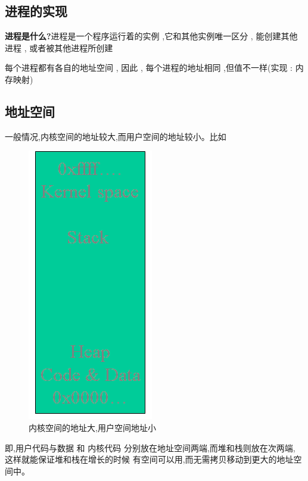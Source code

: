 \documentclass[UTF8,a4paper]{ctexart}
\begin{document}
\subsection{进程的实现}
\textbf{进程是什么?}进程是一个程序运行着的实例 ,它和其他实例唯一区分 , 能创建其他进程 , 或者被其他进程所创建

每个进程都有各自的地址空间 , 因此 , 每个进程的地址相同 ,但值不一样(实现 : 内存映射)

\subsection{地址空间}
一般情况,内核空间的地址较大,而用户空间的地址较小。比如
\begin{figure}[H]
	\centering
	\includegraphics[scale = 0.3]{assets/ModernOperatingSystems_8866a.png}
	\caption{内核空间的地址大,用户空间地址小}
\end{figure}
即,用户代码与数据 和 内核代码 分别放在地址空间两端,而堆和栈则放在次两端, 这样就能保证堆和栈在增长的时候
有空间可以用,而无需拷贝移动到更大的地址空间中。
\end{document}
